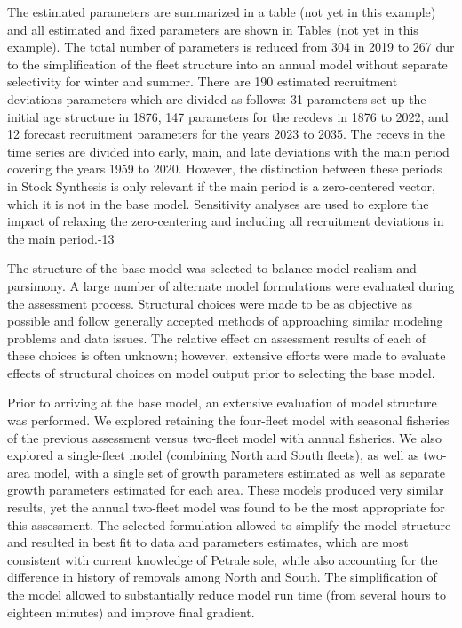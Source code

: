 \documentclass[
]{scrartcl}
\begin{document}
The estimated parameters are summarized in a table (not yet in this
example) and all estimated and fixed parameters are shown in Tables (not
yet in this example). The total number of parameters is reduced from 304
in 2019 to 267 dur to the simplification of the fleet structure into an
annual model without separate selectivity for winter and summer. There
are 190 estimated recruitment deviations parameters which are divided as
follows: 31 parameters set up the initial age structure in 1876, 147
parameters for the recdevs in 1876 to 2022, and 12 forecast recruitment
parameters for the years 2023 to 2035. The recevs in the time series are
divided into early, main, and late deviations with the main period
covering the years 1959 to 2020. However, the distinction between these
periods in Stock Synthesis is only relevant if the main period is a
zero-centered vector, which it is not in the base model. Sensitivity
analyses are used to explore the impact of relaxing the zero-centering
and including all recruitment deviations in the main period.-13

The structure of the base model was selected to balance model realism
and parsimony. A large number of alternate model formulations were
evaluated during the assessment process. Structural choices were made to
be as objective as possible and follow generally accepted methods of
approaching similar modeling problems and data issues. The relative
effect on assessment results of each of these choices is often unknown;
however, extensive efforts were made to evaluate effects of structural
choices on model output prior to selecting the base model.

Prior to arriving at the base model, an extensive evaluation of model
structure was performed. We explored retaining the four-fleet model with
seasonal fisheries of the previous assessment versus two-fleet model
with annual fisheries. We also explored a single-fleet model (combining
North and South fleets), as well as two-area model, with a single set of
growth parameters estimated as well as separate growth parameters
estimated for each area. These models produced very similar results, yet
the annual two-fleet model was found to be the most appropriate for this
assessment. The selected formulation allowed to simplify the model
structure and resulted in best fit to data and parameters estimates,
which are most consistent with current knowledge of Petrale sole, while
also accounting for the difference in history of removals among North
and South. The simplification of the model allowed to substantially
reduce model run time (from several hours to eighteen minutes) and
improve final gradient.
\end{document}
